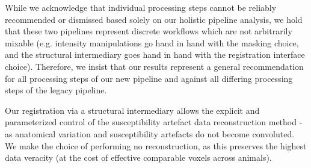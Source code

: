 While we acknowledge that individual processing steps cannot be reliably recommended or dismissed based solely on our holistic pipeline analysis, we hold that these two pipelines represent discrete workflows which are not arbitrarily mixable (e.g. intensity manipulations go hand in hand with the masking choice, and the structural intermediary goes hand in hand with the registration interface choice).
Therefore, we insist that our results represent a general recommendation for all processing steps of our new pipeline and against all differing processing steps of the legacy pipeline.

Our registration via a structural intermediary allows the explicit and parameterized control of the susceptibility artefact data reconstruction method - as anatomical variation and susceptibility artefacts do not become convoluted.
We make the choice of performing no reconstruction, as this preserves the highest data veracity (at the cost of effective comparable voxels across animals).
